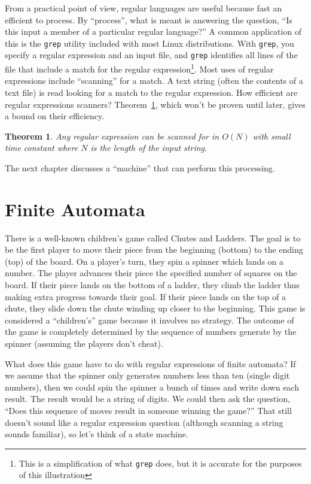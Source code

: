 \documentclass[letterpaper,12pt,openany,reqno]{book}%
\newcommand{\code}[1] {\lstinline[breaklines=yes,breakatwhitespace=yes]{#1}}
\newtheorem{theorem}{Theorem}
\begin{document}
From a practical point of view, regular languages are useful because fast an efficient to process. By ``process'', what is meant is answering the question, ``Is this input a member of a particular regular language?'' A common application of this is the \code{grep} utility included with most Linux distributions. With \code{grep}, you specify a regular expression and an input file, and \code{grep} identifies all lines of the file that include a match for the regular expression\footnote{This is a simplification of what \code{grep} does, but it is accurate for the purposes of this illustration}. Most uses of regular expressions include ``scanning'' for a match. A text string (often the contents of a text file) is read looking for a match to the regular expression. How efficient are regular expressions scanners? Theorem~\ref{TH.O.N.for.res}, which won't be proven until later, gives a bound on their efficiency.
\begin{theorem}
\label{TH.O.N.for.res}
Any regular expression can be scanned for in $O(N)$ with small time constant where $N$ is the length of the input string.
\end{theorem}

The next chapter discusses a ``machine'' that can perform this processing.

\chapter{Finite Automata}
There is a well-known children's game called Chutes and Ladders. The goal is to be the first player to move their piece from the beginning (bottom) to the ending (top) of the board. On a player's turn, they spin a spinner which lands on a number. The player advances their piece the specified number of squares on the board. If their piece lands on the bottom of a ladder, they climb the ladder thus making extra progress towards their goal. If their piece lands on the top of a chute, they slide down the chute winding up closer to the beginning. This game is considered a ``children's'' game because it involves no strategy. The outcome of the game is completely determined by the sequence of numbers generate by the spinner (assuming the players don't cheat).

What does this game have to do with regular expressions of finite automata? If we assume that the spinner only generates numbers less than ten (single digit numbers), then we could spin the spinner a bunch of times and write down each result. The result would be a string of digits. We could then ask the question, ``Does this sequence of moves result in someone winning the game?'' That still doesn't sound like a regular expression question (although scanning a string sounds familiar), so let's think of a state machine.
\end{document}
